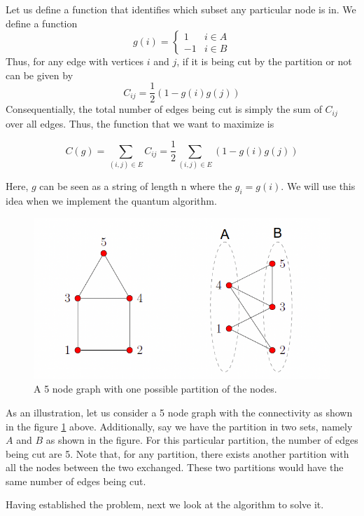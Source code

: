 Let us define a function that identifies which subset any particular node is in. We define a function
\begin{equation}
     g(i) = \begin{cases} 
         1 & i \in A \\
        -1 & i \in B 
   \end{cases}
   \label{g_def}
\end{equation}
Thus, for any edge with vertices $i$ and $j$, if it is being cut by the partition or not can be given by
\begin{equation}
    C_{ij} = \frac{1}{2}(1 - g(i)g(j))
    \label{C_def}
\end{equation}
Consequentially, the total number of edges being cut is simply the sum of $C_{ij}$ over all edges. Thus, the function that we want to maximize is

$$C(g) = \sum_{(i, j) \in E}C_{ij} = \frac{1}{2}\sum_{(i, j) \in E}(1 - g(i)g(j))$$

Here, $g$ can be seen as a string of length n where the $g_i = g(i)$.
We will use this idea when we implement the quantum algorithm.

\begin{figure}[h]
    \centering
    \includegraphics[scale=0.65]{images/GraphCut.png}
    \caption{A 5 node graph with one possible partition of the nodes.}
    \label{fig:GraphCut}
\end{figure}

As an illustration, let us consider a 5 node graph with the connectivity as shown in the figure \ref{fig:GraphCut} above.
Additionally, say we have the partition in two sets, namely $A$ and $B$ as shown in the figure.
For this particular partition, the number of edges being cut are 5.
Note that, for any partition, there exists another partition with all the nodes between the two exchanged.
These two partitions would have the same number of edges being cut.

Having established the problem, next we look at the algorithm to solve it.